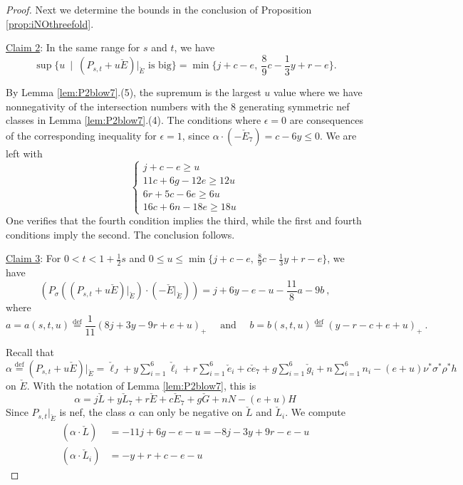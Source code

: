 \documentclass[12pt]{amsart}
\theoremstyle{definition}
\renewcommand{\geq}{\geqslant}
\renewcommand{\leq}{\leqslant}
\newcommand{\deq}{\ensuremath{\stackrel{\textrm{def}}{=}}}
\newcommand{\?}{ \circled{{\large\bf ?}}}
\begin{document}
\begin{proof}
Next we determine the bounds in the conclusion of Proposition \ref{prop:iNOthreefold}.

\underline{Claim 2}: In the same range for $s$ and $t$, we have
\[\sup\{u\ \mid\ (P_{s,t}+u\check E)|_{\check E}\text{ is big}\}=\min\{j+c-e,\ \frac 89c-\frac 13y+r-e\}.\]

 By Lemma \ref{lem:P2blow7}.(5), the supremum is the largest $u$ value where we have nonnegativity of the intersection numbers with the 8 generating symmetric nef classes in Lemma \ref{lem:P2blow7}.(4). The conditions where $\epsilon=0$ are consequences of the corresponding inequality for $\epsilon=1$, since $\alpha\cdot(-\check E_7)=c-6y\leq 0$. We are left with
\[\begin{cases}
	j+c-e\geq u\\
	11c+6g-12e\geq 12u\\
	6r+5c-6e\geq 6u\\
	16c+6n-18e\geq 18u 
\end{cases}\] 
One verifies that the fourth condition implies the third, while the first and fourth conditions imply the second. The conclusion follows.
\smallskip

\underline{Claim 3}: For $0<t<1+\frac 12s$ and $0\leq u\leq\min\{j+c-e,\ \frac 89c-\frac 13y+r-e\}$, we have
\[(P_{\sigma}((P_{s,t}+u\check E)|_{\check E})\cdot(-\check E|_{\check E}))=j+6y-e-u-\frac{11}8a-9b\ ,\]
where
\[a=a(s,t,u)\deq\frac 1{11}(8j+3y-9r+e+u)_+\quad\text{ and }\quad b=b(s,t,u)\deq (y-r-c+e+u)_+\ .\]

Recall that $\alpha\deq (P_{s,t}+u\check E)|_{\check E}=\check{\ell}_J+y\sum_{i=1}^6\check{\ell}_i+r\sum_{i=1}^6\check e_i+c\check e_7+g\sum_{i=1}^6\check g_i+n\sum_{i=1}^6n_i-(e+u)\nu^*\sigma^*\rho^*h$ on $\check E$. With the notation of Lemma \ref{lem:P2blow7}, this is
\[\alpha=j\check L+y\check L_7+r\check E+c\check E_7+g\check G+n N-(e+u)H\]
Since $P_{s,t}|_{\check E}$ is nef, the class $\alpha$ can only be negative on $\check L$ and $\check L_i$.
We compute
\begin{align*}
	(\alpha\cdot\check{L})&=-11j+6g-e-u=-8j-3y+9r-e-u\\
	(\alpha\cdot\check{L}_i)&=-y+r+c-e-u
\end{align*}


\end{proof}
\end{document}
